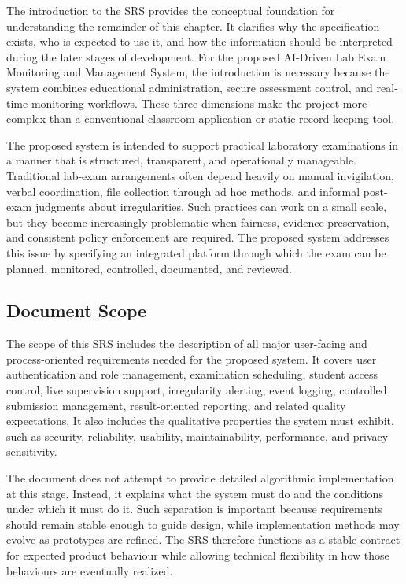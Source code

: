 The introduction to the SRS provides the conceptual foundation for understanding the remainder of this chapter. It clarifies why the specification exists, who is expected to use it, and how the information should be interpreted during the later stages of development. For the proposed AI-Driven Lab Exam Monitoring and Management System, the introduction is necessary because the system combines educational administration, secure assessment control, and real-time monitoring workflows. These three dimensions make the project more complex than a conventional classroom application or static record-keeping tool.

The proposed system is intended to support practical laboratory examinations in a manner that is structured, transparent, and operationally manageable. Traditional lab-exam arrangements often depend heavily on manual invigilation, verbal coordination, file collection through ad hoc methods, and informal post-exam judgments about irregularities. Such practices can work on a small scale, but they become increasingly problematic when fairness, evidence preservation, and consistent policy enforcement are required. The proposed system addresses this issue by specifying an integrated platform through which the exam can be planned, monitored, controlled, documented, and reviewed.

\subsection{Document Scope}

The scope of this SRS includes the description of all major user-facing and process-oriented requirements needed for the proposed system. It covers user authentication and role management, examination scheduling, student access control, live supervision support, irregularity alerting, event logging, controlled submission management, result-oriented reporting, and related quality expectations. It also includes the qualitative properties the system must exhibit, such as security, reliability, usability, maintainability, performance, and privacy sensitivity.

The document does not attempt to provide detailed algorithmic implementation at this stage. Instead, it explains what the system must do and the conditions under which it must do it. Such separation is important because requirements should remain stable enough to guide design, while implementation methods may evolve as prototypes are refined. The SRS therefore functions as a stable contract for expected product behaviour while allowing technical flexibility in how those behaviours are eventually realized.

